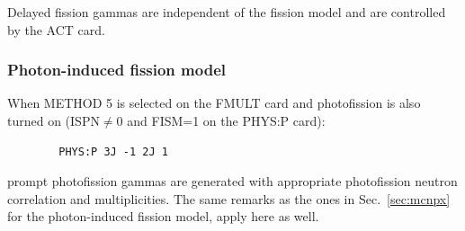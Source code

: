 Delayed fission gammas are independent of the fission model and are controlled by the ACT card.

\subsubsection*{Photon-induced fission model}

When METHOD 5 is selected on the FMULT card and photofission is also turned on (ISPN$\ne$0 and FISM=1 on the PHYS:P card):
\begin{verbatim}
        PHYS:P 3J -1 2J 1
\end{verbatim}
prompt photofission gammas are generated with appropriate photofission neutron correlation and multiplicities. The same remarks as the ones in Sec.~\ref{sec:mcnpx} for the photon-induced fission model, apply here as well.

